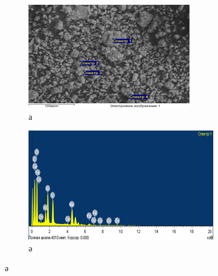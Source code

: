 \begin{figure}[H]
    \centering
    \begin{subfigure}[b]{0.45\textwidth}
        \centering
        \includegraphics[width=\textwidth]{assets/1048}
        \caption*{а}
    \end{subfigure}
    \hfill
    \begin{subfigure}[b]{0.45\textwidth}
        \centering
        \includegraphics[width=\textwidth]{assets/1048.1}
        \caption*{ә}
    \end{subfigure}
\end{figure}

